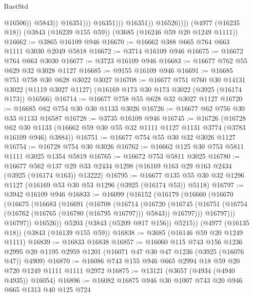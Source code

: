 \begin{lexlean}{RustStd}
\begin{coremodule}
                                    @16506))
                                @5843))
                            @16351)))
                      @16351)))
                @16351))
            @16526))))
    (@4977 (@16235 @18))
    (@3843 (@16239 @155 @59))
    (@3685 (@16246 @59 @20 @1249 @1111))
@16662 := @3865 @16109 @946
@16670 := @16662 @388 @665 @764 @663 @1111 @3030 @2049 @5818
@16672 := @3714 @16109 @946
@16675 := @16672 @764 @663 @3030
@16677 := @3723 @16109 @946
@16683 := @16677 @762 @55 @629 @32 @3028 @1127
@16685 := @9155 @16109 @946
@16691 := @16685 @751 @758 @30 @628 @3022 @3027
@16708 := @16677
    @751
    @760
    @30
    @14131
    @3022
    (@1119 @3027 @1127)
    (@16169 @173 @30 @173 @3022 (@3925 (@16174 @173)) @16566)
@16714 := @16677 @758 @55 @628 @32 @3027 @1127
@16720 := @16685 @62 @754 @30 @30 @1133 @3026
@16726 := @16677 @62 @756 @30 @33 @1133 @16587
@16728 := @3735 @16109 @946
@16745 := @16726
    (@16728
      @62
      @30
      @1133
      (@16662 @59 @30 @55 @32 @1111 @1127 @1131 @3774 (@3783 @16109 @946) @3884))
@16751 := @16677 @754 @55 @30 @32 @3026 @1127
@16754 := @16728 @754 @30 @3026
@16762 := @16662 @125 @30 @753 @5811 @1111 @3025 @1354 @5819
@16765 := @16672 @753 @5811 @3025
@16780 := @16677
    @562
    @137
    @29
    @33
    @2434
    @1298
    (@16169 @163 @29 @163 @2434 (@3925 (@16174 @163)) @13222)
@16795 := @16677 @135 @55 @30 @32 @1296 @1127 (@16169 @53 @30 @53 @1296 (@3925 (@16174 @53)) @5118)
@16797 := @3942 @16109 @946
@16833 := @16099
    (@16152
      (@16179
        (@16660
          (@16670
            (@16675
              (@16683
                (@16691
                  (@16708
                    (@16714
                      (@16720
                        (@16745
                          (@16751
                            (@16754 (@16762 (@16765 (@16780 (@16795 @16797))) @5843))
                            @16797)))
                      @16797)))
                @16797))
            @16526))
        @5203
        (@3843 (@5209 @817 @156))
        @5215))
    (@4977 (@16135 @18))
    (@3843 (@16139 @155 @59))
@16838 := @3685 (@16146 @59 @20 @1249 @1111)
@16839 := @16833 @16838
@16857 := @16060
    @115
    @743
    @156
    @1236
    @2995
    @20
    @1195
    @2959
    @1201
    (@16071 @47 @30 @47 @1236 (@3925 (@16076 @47)) @4909)
@16870 := @16086 @743 @155 @946 @665 @2994 @18 @59 @20 @720 @1249 @1111 @1111 @2972
@16875 := @13121 (@3657 (@4934 (@4940 @4935)) @16054)
@16896 := @16082
    @16875
    @946
    @30
    @1007
    @743
    @20
    @946
    @665
    @1313
    @40
    @125
    @724

\end{coremodule}
\end{lexlean}
